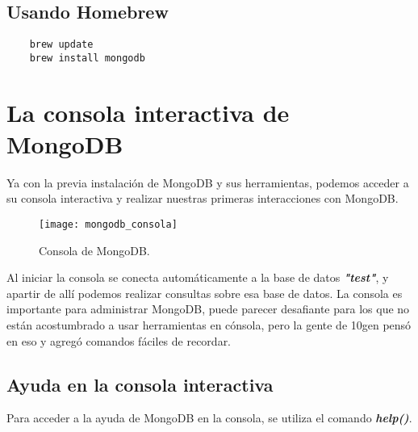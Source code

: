 \subsection*{Usando Homebrew}

\begin{lstlisting}
    brew update
    brew install mongodb
\end{lstlisting}

\section{La consola interactiva de MongoDB}

Ya con la previa instalaci\'on de MongoDB y sus herramientas, podemos acceder a su consola interactiva y realizar nuestras primeras interacciones con MongoDB.

\begin{figure}[!ht]
    \centering
    \texttt{[image: mongodb\_consola]} 
    \caption[Consola de MongoDB]{Consola de MongoDB.}
\end{figure}

Al iniciar la consola se conecta autom\'aticamente a la base de datos \textit{\textbf{"test"}}, y apartir de all\'i podemos realizar consultas sobre esa base de datos. La consola es importante para administrar MongoDB, puede parecer desafiante para los que no est\'an acostumbrado a usar herramientas en c\'onsola, pero la gente de 10gen pens\'o en eso y agreg\'o comandos f\'aciles de recordar.

\subsection{Ayuda en la consola interactiva}

Para acceder a la ayuda de MongoDB en la consola, se utiliza el comando \textit{\textbf{help()}}.

